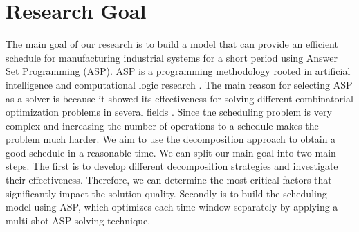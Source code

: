 \documentclass[submission,copyright,creativecommons]{eptcs}
\begin{document}
\section{Research Goal}
The main goal of our research is to build a model that can provide an efficient schedule for manufacturing industrial systems for a short period using Answer Set Programming (ASP). ASP is a programming methodology rooted in artificial intelligence and computational logic research \cite{lifschitz2002answer}. The main reason for selecting ASP as a solver is because it showed its effectiveness for solving different combinatorial optimization problems in several fields \cite{abseher2016shift,ricca2012team,abels2019train}. Since the scheduling problem is very complex and increasing the number of operations to a schedule makes the problem much harder. We aim to use the decomposition approach to obtain a good schedule in a reasonable time. We can split our main goal into two main steps. The first is to develop different decomposition strategies and investigate their effectiveness. Therefore, we can determine the most critical factors that significantly impact the solution quality. Secondly is to build the scheduling model using ASP, which optimizes each time window separately by applying a multi-shot ASP solving technique\cite{gebser2019multi}. 
\end{document}
